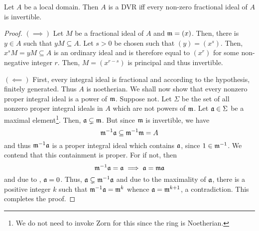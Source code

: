 \begin{proposition}
    Let $A$ be a local domain. Then $A$ is a DVR iff every non-zero fractional ideal of $A$ is invertible.
\end{proposition}
\begin{proof}
    $(\implies)$ Let $M$ be a fractional ideal of $A$ and $\mathfrak m = (x)$. Then, there is $y\in A$ such that $yM\subseteq A$. Let $s > 0$ be chosen such that $(y) = (x^s)$. Then, $x^sM = yM\subseteq A$ is an ordinary ideal and is therefore equal to $(x^r)$ for some non-negative integer $r$. Then, $M = (x^{r - s})$ is principal and thus invertible. 

    $(\impliedby)$ First, every integral ideal is fractional and according to the hypothesis, finitely generated. Thus $A$ is noetherian. We shall now show that every nonzero proper integral ideal is a power of $\mathfrak m$. Suppose not. Let $\Sigma$ be the set of all nonzero proper integral ideals in $A$ which are not powers of $\mathfrak m$. Let $\mathfrak a\in\Sigma$ be a maximal element\footnote{We do not need to invoke Zorn for this since the ring is Noetherian.}. Then, $\mathfrak a\subsetneq\mathfrak m$. But since $\mathfrak m$ is invertible, we have 
    \begin{equation*}
        \mathfrak m^{-1}\mathfrak a\subseteq\mathfrak m^{-1}\mathfrak m = A
    \end{equation*}
    and thus $\mathfrak m^{-1}\mathfrak a$ is a proper integral ideal which contains $\mathfrak a$, since $1\in\mathfrak m^{-1}$. We contend that this containment is proper. For if not, then 
    \begin{equation*}
        \mathfrak m^{-1}\mathfrak a = \mathfrak a\implies\mathfrak a = \mathfrak m\mathfrak a
    \end{equation*}
    and due to , $\mathfrak a = 0$. Thus, $\mathfrak a\subsetneq\mathfrak m^{-1}\mathfrak a$ and due to the maximality of $\mathfrak a$, there is a positive integer $k$ such that $\mathfrak m^{-1}\mathfrak a = \mathfrak m^k$ whence $\mathfrak a = \mathfrak m^{k + 1}$, a contradiction. This completes the proof.
\end{proof}

